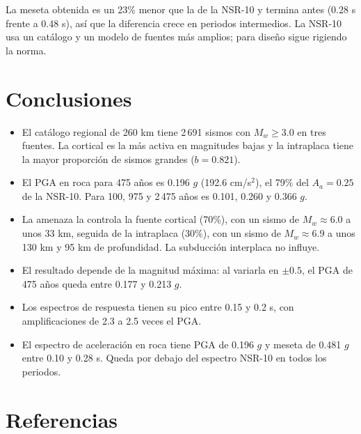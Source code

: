 \documentclass[12pt,oneside]{article}
\begin{document}
La meseta obtenida es un 23\% menor que la de la NSR-10 y termina antes
(0.28 s frente a 0.48 s), así que la diferencia crece en periodos
intermedios. La NSR-10 usa un catálogo y un modelo de fuentes más amplios;
para diseño sigue rigiendo la norma.

\section{Conclusiones}

\begin{itemize}
    \item El catálogo regional de 260 km tiene 2\,691 sismos con $M_w\geq3.0$
    en tres fuentes. La cortical es la más activa en magnitudes bajas y la
    intraplaca tiene la mayor proporción de sismos grandes ($b=0.821$).
    \item El PGA en roca para 475 años es 0.196 $g$ (192.6 cm/s$^2$), el 79\%
    del $A_a=0.25$ de la NSR-10. Para 100, 975 y 2\,475 años es 0.101, 0.260
    y 0.366 $g$.
    \item La amenaza la controla la fuente cortical (70\%), con un sismo de
    $M_w\approx6.0$ a unos 33 km, seguida de la intraplaca (30\%), con un
    sismo de $M_w\approx6.9$ a unos 130 km y 95 km de profundidad. La
    subducción interplaca no influye.
    \item El resultado depende de la magnitud máxima: al variarla en
    $\pm0.5$, el PGA de 475 años queda entre 0.177 y 0.213 $g$.
    \item Los espectros de respuesta tienen su pico entre 0.15 y 0.2 s, con
    amplificaciones de 2.3 a 2.5 veces el PGA.
    \item El espectro de aceleración en roca tiene PGA de 0.196 $g$ y meseta
    de 0.481 $g$ entre 0.10 y 0.28 s. Queda por debajo del espectro NSR-10 en
    todos los periodos.
\end{itemize}

\section*{Referencias}
\small
\printbibliography[heading=none]
\end{document}

